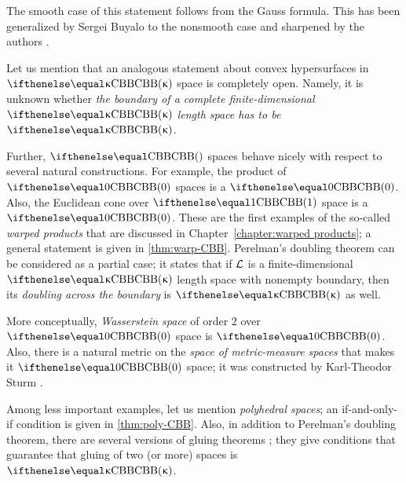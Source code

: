 The smooth case of this statement follows from the Gauss formula.
This has been generalized by Sergei Buyalo \cite{buyalo} to the nonsmooth case and sharpened by the authors \cite{alexander-kapovitch-petrunin-buyalo}.

Let us mention that an analogous statement about convex hypersurfaces in $\Alex{\kappa}$ space is completely open.
Namely, it is unknown whether \textit{the boundary of a complete finite-dimensional $\Alex{\kappa}$ length space has to be $\Alex{\kappa}$}.

Further, $\Alex{}$ spaces behave nicely with respect to several natural constructions.
For example, the product of $\Alex{0}$ spaces is a $\Alex{0}$.
Also, the Euclidean cone over $\Alex{1}$ space is a $\Alex{0}$.
These are the first examples of the so-called \textit{warped products} that are discussed in Chapter~\ref{chapter:warped products};
a general statement is given in \ref{thm:warp-CBB}.
Perelman's doubling theorem can be considered as a partial case;
it states that if $\mathcal{L}$ is a finite-dimensional $\Alex{\kappa}$ length space with nonempty boundary, then its \textit{doubling across the boundary} is $\Alex{\kappa}$ as well.

More conceptually, \textit{Wasserstein space} of order $2$ over $\Alex0$ space is $\Alex0$.
Also, there is a natural metric on the \textit{space of metric-measure spaces} that makes it $\Alex0$ space;
it was constructed by Karl-Theodor Sturm \cite{sturm-2012}.

Among less important examples, let us mention \textit{polyhedral spaces};
an if-and-only-if condition is given in \ref{thm:poly-CBB}.
Also, in addition to Perelman's doubling theorem, 
there are several versions of gluing theorems \cite{petrunin1997, ge-li, Kosovski};
they give conditions that guarantee that gluing of two (or more) spaces is $\Alex{\kappa}$.










